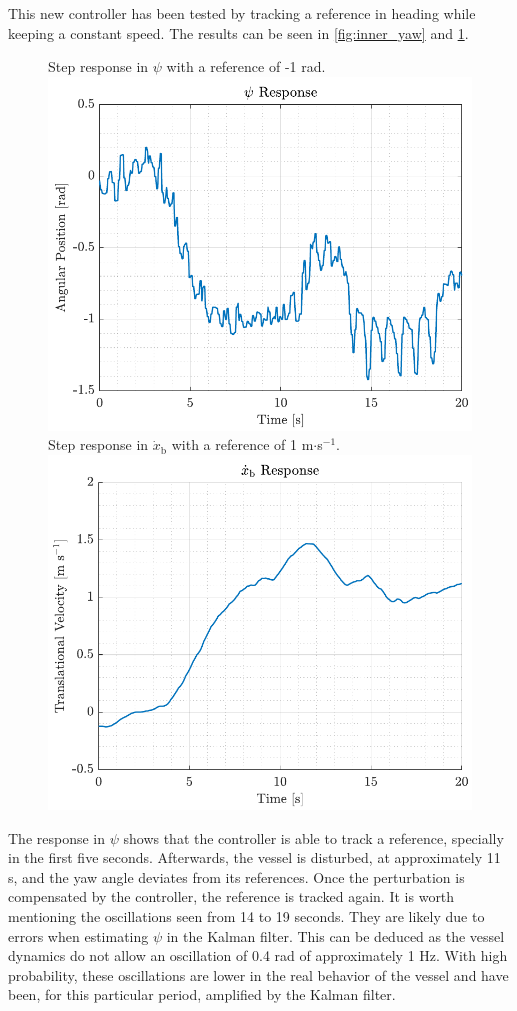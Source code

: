 This new controller has been tested by tracking a reference in heading while keeping a constant speed. The results can be seen in \autoref{fig:inner_yaw} and \ref{fig:inner_xbdot}.
%
\begin{figure}[H]
    \captionbox 
    {   
        Step response in $\psi$ with a reference of -1 rad.
        \label{fig:inner_yaw}
    }                                                                 
    {                                                                  
        \includegraphics[width=.45\textwidth]{figures/inner_yaw}         
    }                                                                    
    \hspace{5pt}                                                          
    \captionbox  
    {      
        Step response in $\dot{x}_\mathrm{b}$ with a reference of 1 m$\cdot$s$^{-1}$.
        \label{fig:inner_xbdot}
    }                                                                          
    {
        \includegraphics[width=.45\textwidth]{figures/inner_xbdot}
    }
\end{figure}

The response in $\psi$ shows that the controller is able to track a reference, specially in the first five seconds. Afterwards, the vessel is disturbed, at approximately 11 s, and the yaw angle deviates from its references. Once the perturbation is compensated by the controller, the reference is tracked again. It is worth mentioning the oscillations seen from 14 to 19 seconds. They are likely due to errors when estimating $\psi$ in the Kalman filter. This can be deduced as the vessel dynamics do not allow an oscillation of 0.4 rad of approximately 1 Hz. With high probability, these oscillations are lower in the real behavior of the vessel and have been, for this particular period, amplified by the Kalman filter.


